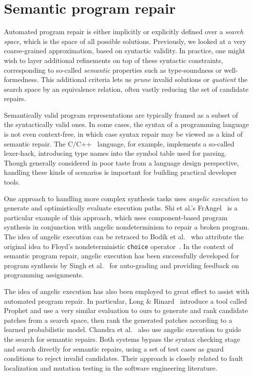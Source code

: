 \section{Semantic program repair}

Automated program repair is either implicitly or explicitly defined over a \textit{search space}, which is the space of all possible solutions. Previously, we looked at a very coarse-grained approximation, based on syntactic validity. In practice, one might wish to layer additional refinements on top of these syntactic constraints, corresponding to so-called \textit{semantic} properties such as type-soundness or well-formedness. This additional criteria lets us \textit{prune} invalid solutions or \textit{quotient} the search space by an equivalence relation, often vastly reducing the set of candidate repairs.

Semantically valid program representations are typically framed as a subset of the syntactically valid ones. In some cases, the syntax of a programming language is not even context-free, in which case syntax repair may be viewed as a kind of semantic repair. The C/C++~\cite{mcpeak2004elkhound} language, for example, implements a so-called lexer-hack, introducing type names into the symbol table used for parsing. Though generally considered in poor taste from a language design perspective, handling these kinds of scenarios is important for building practical developer tools.

One approach to handling more complex synthesis tasks uses \textit{angelic execution} to generate and optimistically evaluate execution paths. Shi et al.'s FrAngel~\cite{shi2019frangel} is a particular example of this approach, which uses component-based program synthesis in conjunction with angelic nondeterminism to repair a broken program. The idea of angelic execution can be retraced to Bod\'ik et al.~\cite{bodik2010programming} who attribute the original idea to Floyd's nondeterministic \texttt{choice} operator~\cite{floyd1967nondeterministic}. In the context of semantic program repair, angelic execution has been successfully developed for program synthesis by Singh et al.~\cite{singh2013automated} for auto-grading and providing feedback on programming assignments.

The idea of angelic execution has also been employed to great effect to assist with automated program repair. In particular, Long \& Rinard~\cite{long2016automatic} introduce a tool called Prophet and use a very similar evaluation to ours to generate and rank candidate patches from a search space, then rank the generated patches according to a learned probabilistic model. Chandra et al.~\cite{chandra2011angelic} also use angelic execution to guide the search for semantic repairs. Both systems bypass the syntax checking stage and search directly for semantic repairs, using a set of test cases as guard conditions to reject invalid candidates. Their approach is closely related to fault localization and mutation testing in the software engineering literature.

\clearpage